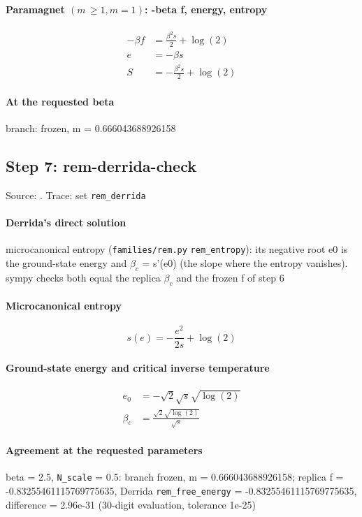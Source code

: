 \documentclass[11pt]{article}
\begin{document}
\paragraph{Paramagnet $(m\,\geq  1, m = 1)$: -beta f, energy, entropy}
\begin{align}
- \beta f &= \frac{\beta^{2} s}{2} + \log{\left(2 \right)} \\
e &= - \beta s \\
S &= - \frac{\beta^{2} s}{2} + \log{\left(2 \right)}
\end{align}
\paragraph{At the requested beta}
branch: frozen, m = 0.666043688926158
\subsection{Step 7: rem-derrida-check}
Source: \cite{b3,b1,b2}. Trace: set \texttt{rem\_derrida}

\paragraph{Derrida's direct solution}
microcanonical entropy (\texttt{families/rem.py} \texttt{rem\_entropy}): its negative root e0 is the ground-state energy and $\beta _{c}$ = s'(e0) (the slope where the entropy vanishes).  sympy checks both equal the replica $\beta _{c}$ and the frozen f of step 6
\paragraph{Microcanonical entropy}
\begin{equation}
s{\left(e \right)} = - \frac{e^{2}}{2 s} + \log{\left(2 \right)}
\end{equation}
\paragraph{Ground-state energy and critical inverse temperature}
\begin{align}
e_{0} &= - \sqrt{2} \sqrt{s} \sqrt{\log{\left(2 \right)}} \\
\beta_{c} &= \frac{\sqrt{2} \sqrt{\log{\left(2 \right)}}}{\sqrt{s}}
\end{align}
\paragraph{Agreement at the requested parameters}
beta = 2.5, \texttt{N\_scale} = 0.5: branch frozen, m = 0.666043688926158; replica f = -0.83255461115769775635, Derrida \texttt{rem\_free\_energy} = -0.83255461115769775635, \textbar{}difference\textbar{} = 2.96e-31 (30-digit evaluation, tolerance 1e-25)
\end{document}
